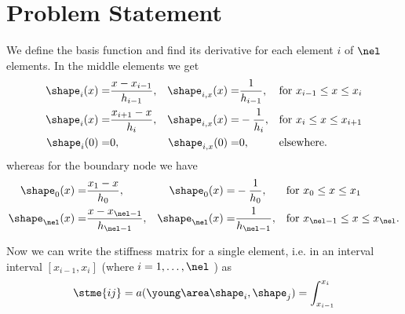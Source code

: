 \documentclass[twoside,a4paper,12pt]{article}
\newcommand{\+}[2]{\newcommand#1{{\color{\notcolor}#2}}}
\newcommand{\1}[2]{\newcommand{#1}[1]{{\color{\notcolor}#2}}}
\newcommand{\2}[2]{\newcommand{#1}[2]{{\color{\notcolor}#2}}}
\begin{document}
\section{Problem Statement}

We define the basis function and find its derivative for each element
$i$ of $\nel$ elements. In the middle elements we get
\begin{align}
\shape_i(x) =& \frac{x-x_{i-1}}{h_{i-1}}, &\shape_{i,x}(x) =& \frac{1}{h_{i-1}},&&\text{for } x_{i-1} \leq x \leq x_i \\
\shape_i(x) =& \frac{x_{i+1}-x}{h_{i}},  &\shape_{i,x}(x) =& -\frac{1}{h_{i}}, &&\text{for }x_i \leq x \leq x_{i+1} \\
\shape_i(0) =& 0,                       &\shape_{i,x}(0) =& 0,                &&\text{elsewhere.}
\end{align}
%
whereas for the boundary node we have
%
\begin{align}
\shape_0(x) =& \frac{x_1-x}{h_{0}},             &\shape_0(x) =& -\frac{1}{h_{0}},                          &&\text{for } x_0 \leq x \leq x_{1} \\
\shape_\nel(x) =& \frac{x-x_{\nel-1}}{h_{\nel-1}},&\shape_\nel(x) =& \frac{1}{h_{\nel-1}},             &&\text{for } x_{\nel-1} \leq x \leq x_\nel .
\end{align}

Now we can write the stiffness matrix for a single element, i.e. in an
interval interval $[x_{i-1}, x_i]$ (where $i = 1, \hdots, \nel$ ) as
%
\begin{align}
\stme{ij} = a(\young\area\shape_i,\shape_j) = \int_{x_{i-1}}^{x_i}
\end{align}
\end{document}
